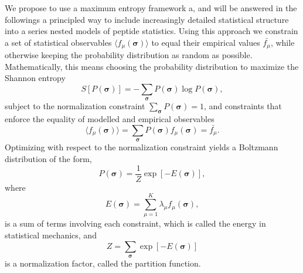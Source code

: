 \documentclass[superscriptaddress,twocolumn,pre]{revtex4}
\newcommand{\B}{\boldsymbol}
\newcommand{\<}{\langle}
\renewcommand{\>}{\rangle}
\begin{document}
We propose to use a maximum entropy framework a, and will be answered in the followings a principled way to include increasingly detailed statistical structure into a series nested models of peptide statistics. Using this approach we constrain a set of statistical observables $\langle f_\mu(\boldsymbol \sigma)\rangle$ to equal their empirical values $\bar{f_\mu}$, while otherwise keeping the probability distribution as random as possible. Mathematically, this means choosing the probability distribution to maximize the Shannon entropy
\begin{equation}
    S[P(\B \sigma)] = - \sum_{\B \sigma} P(\B \sigma) \log P(\B \sigma),
\end{equation}
subject to the normalization constraint $\sum_{\B \sigma} P(\B \sigma) = 1$, and constraints that enforce the equality of modelled and empirical observables
\begin{equation}
    \langle f_\mu(\boldsymbol \sigma)\rangle = \sum_{\boldsymbol \sigma} P(\boldsymbol \sigma) f_\mu(\boldsymbol \sigma) = \bar{f_\mu}.
\end{equation}
Optimizing with respect to the normalization constraint yields a Boltzmann distribution of the form,
\begin{equation}
    P(\boldsymbol \sigma) = \frac{1}{Z} \exp\left[ -E(\B \sigma) \right],
\end{equation}
where
\begin{equation}
 E(\B \sigma) = \sum_{\mu=1}^K \lambda_\mu f_\mu(\boldsymbol \sigma),
\end{equation}
is a sum of terms involving each constraint, which is called the energy in statistical mechanics, and 
\begin{equation}
    Z = \sum_{\B \sigma} \exp \left[ - E(\B \sigma) \right]
\end{equation}
is a normalization factor, called the partition function.
\end{document}
